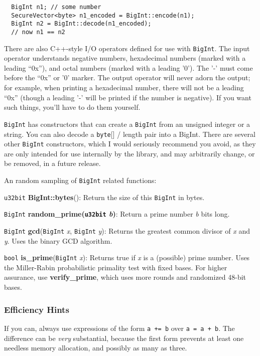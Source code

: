 \documentclass{article}
\newcommand{\function}[1]{\textbf{#1}}
\newcommand{\type}[1]{\texttt{#1}}
\renewcommand{\arg}[1]{\textsl{#1}}
\begin{document}
\begin{verbatim}
  BigInt n1; // some number
  SecureVector<byte> n1_encoded = BigInt::encode(n1);
  BigInt n2 = BigInt::decode(n1_encoded);
  // now n1 == n2
\end{verbatim}

There are also C++-style I/O operators defined for use with \type{BigInt}. The
input operator understands negative numbers, hexadecimal numbers (marked with a
leading ``0x''), and octal numbers (marked with a leading '0'). The '-' must
come before the ``0x'' or '0' marker. The output operator will never adorn the
output; for example, when printing a hexadecimal number, there will not be a
leading ``0x'' (though a leading '-' will be printed if the number is
negative). If you want such things, you'll have to do them yourself.

\type{BigInt} has constructors that can create a \type{BigInt} from an unsigned
integer or a string. You can also decode a \type{byte}[] / length pair into a
BigInt. There are several other \type{BigInt} constructors, which I would
seriously recommend you avoid, as they are only intended for use internally by
the library, and may arbitrarily change, or be removed, in a future release.

An random sampling of \type{BigInt} related functions:

\type{u32bit} \function{BigInt::bytes}(): Return the size of this \type{BigInt}
in bytes.

\type{BigInt} \function{random\_prime(\type{u32bit} \arg{b})}: Return a prime
number \arg{b} bits long.

\type{BigInt} \function{gcd}(\type{BigInt} \arg{x}, \type{BigInt} \arg{y}):
Returns the greatest common divisor of \arg{x} and \arg{y}. Uses the binary
GCD algorithm.

\type{bool} \function{is\_prime}(\type{BigInt} \arg{x}): Returns true if
\arg{x} is a (possible) prime number. Uses the Miller-Rabin probabilistic
primality test with fixed bases. For higher assurance, use
\function{verify\_prime}, which uses more rounds and randomized 48-bit bases.

\subsubsection{Efficiency Hints}

If you can, always use expressions of the form \verb|a += b| over
\verb|a = a + b|. The difference can be \emph{very} substantial,
because the first form prevents at least one needless memory
allocation, and possibly as many as three.
\end{document}
